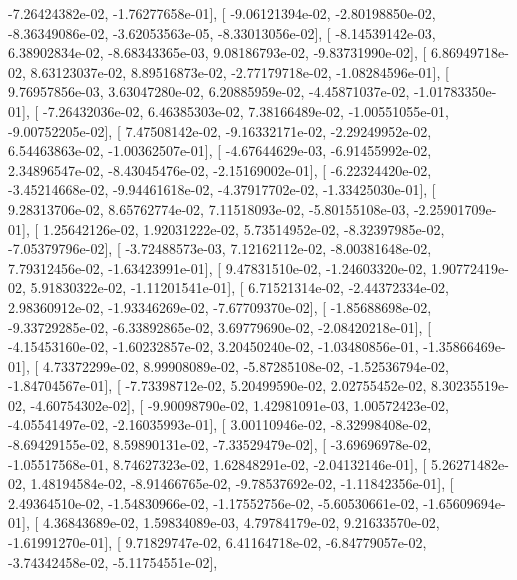 \documentclass{article}
\begin{document}
         -7.26424382e-02,  -1.76277658e-01],
       [ -9.06121394e-02,  -2.80198850e-02,  -8.36349086e-02,
         -3.62053563e-05,  -8.33013056e-02],
       [ -8.14539142e-03,   6.38902834e-02,  -8.68343365e-03,
          9.08186793e-02,  -9.83731990e-02],
       [  6.86949718e-02,   8.63123037e-02,   8.89516873e-02,
         -2.77179718e-02,  -1.08284596e-01],
       [  9.76957856e-03,   3.63047280e-02,   6.20885959e-02,
         -4.45871037e-02,  -1.01783350e-01],
       [ -7.26432036e-02,   6.46385303e-02,   7.38166489e-02,
         -1.00551055e-01,  -9.00752205e-02],
       [  7.47508142e-02,  -9.16332171e-02,  -2.29249952e-02,
          6.54463863e-02,  -1.00362507e-01],
       [ -4.67644629e-03,  -6.91455992e-02,   2.34896547e-02,
         -8.43045476e-02,  -2.15169002e-01],
       [ -6.22324420e-02,  -3.45214668e-02,  -9.94461618e-02,
         -4.37917702e-02,  -1.33425030e-01],
       [  9.28313706e-02,   8.65762774e-02,   7.11518093e-02,
         -5.80155108e-03,  -2.25901709e-01],
       [  1.25642126e-02,   1.92031222e-02,   5.73514952e-02,
         -8.32397985e-02,  -7.05379796e-02],
       [ -3.72488573e-03,   7.12162112e-02,  -8.00381648e-02,
          7.79312456e-02,  -1.63423991e-01],
       [  9.47831510e-02,  -1.24603320e-02,   1.90772419e-02,
          5.91830322e-02,  -1.11201541e-01],
       [  6.71521314e-02,  -2.44372334e-02,   2.98360912e-02,
         -1.93346269e-02,  -7.67709370e-02],
       [ -1.85688698e-02,  -9.33729285e-02,  -6.33892865e-02,
          3.69779690e-02,  -2.08420218e-01],
       [ -4.15453160e-02,  -1.60232857e-02,   3.20450240e-02,
         -1.03480856e-01,  -1.35866469e-01],
       [  4.73372299e-02,   8.99908089e-02,  -5.87285108e-02,
         -1.52536794e-02,  -1.84704567e-01],
       [ -7.73398712e-02,   5.20499590e-02,   2.02755452e-02,
          8.30235519e-02,  -4.60754302e-02],
       [ -9.90098790e-02,   1.42981091e-03,   1.00572423e-02,
         -4.05541497e-02,  -2.16035993e-01],
       [  3.00110946e-02,  -8.32998408e-02,  -8.69429155e-02,
          8.59890131e-02,  -7.33529479e-02],
       [ -3.69696978e-02,  -1.05517568e-01,   8.74627323e-02,
          1.62848291e-02,  -2.04132146e-01],
       [  5.26271482e-02,   1.48194584e-02,  -8.91466765e-02,
         -9.78537692e-02,  -1.11842356e-01],
       [  2.49364510e-02,  -1.54830966e-02,  -1.17552756e-02,
         -5.60530661e-02,  -1.65609694e-01],
       [  4.36843689e-02,   1.59834089e-03,   4.79784179e-02,
          9.21633570e-02,  -1.61991270e-01],
       [  9.71829747e-02,   6.41164718e-02,  -6.84779057e-02,
         -3.74342458e-02,  -5.11754551e-02],
\end{document}
